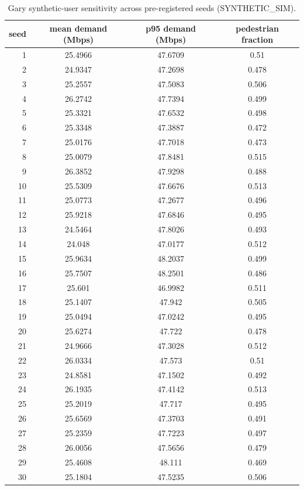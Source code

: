 \begin{table}[h]
\centering
\caption{Gary synthetic-user sensitivity across pre-registered seeds (SYNTHETIC\_SIM).}
\begin{tabular}{rccc}\toprule
seed & mean demand (Mbps) & p95 demand (Mbps) & pedestrian fraction \\\midrule
1 & 25.4966 & 47.6709 & 0.51 \\
2 & 24.9347 & 47.2698 & 0.478 \\
3 & 25.2557 & 47.5083 & 0.506 \\
4 & 26.2742 & 47.7394 & 0.499 \\
5 & 25.3321 & 47.6532 & 0.498 \\
6 & 25.3348 & 47.3887 & 0.472 \\
7 & 25.0176 & 47.7018 & 0.473 \\
8 & 25.0079 & 47.8481 & 0.515 \\
9 & 26.3852 & 47.9298 & 0.488 \\
10 & 25.5309 & 47.6676 & 0.513 \\
11 & 25.0773 & 47.2677 & 0.496 \\
12 & 25.9218 & 47.6846 & 0.495 \\
13 & 24.5464 & 47.8026 & 0.493 \\
14 & 24.048 & 47.0177 & 0.512 \\
15 & 25.9634 & 48.2037 & 0.499 \\
16 & 25.7507 & 48.2501 & 0.486 \\
17 & 25.601 & 46.9982 & 0.511 \\
18 & 25.1407 & 47.942 & 0.505 \\
19 & 25.0494 & 47.0242 & 0.495 \\
20 & 25.6274 & 47.722 & 0.478 \\
21 & 24.9666 & 47.3028 & 0.512 \\
22 & 26.0334 & 47.573 & 0.51 \\
23 & 24.8581 & 47.1502 & 0.492 \\
24 & 26.1935 & 47.4142 & 0.513 \\
25 & 25.2019 & 47.717 & 0.495 \\
26 & 25.6569 & 47.3703 & 0.491 \\
27 & 25.2359 & 47.7223 & 0.497 \\
28 & 26.0056 & 47.5656 & 0.479 \\
29 & 25.4608 & 48.111 & 0.469 \\
30 & 25.1804 & 47.5235 & 0.506 \\
\bottomrule\end{tabular}
\end{table}
